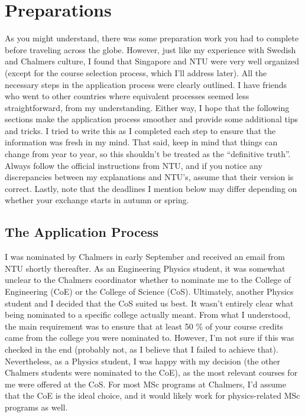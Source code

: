 \chapter*{Preparations}
\vspace{-0.6cm}
As you might understand, there was some preparation work you had to complete before traveling across the globe. However, just like my experience with Swedish and Chalmers culture, I found that Singapore and NTU were very well organized (except for the course selection process, which I'll address later). All the necessary steps in the application process were clearly outlined. I have friends who went to other countries where equivalent processes seemed less straightforward, from my understanding. Either way, I hope that the following sections make the application process smoother and provide some additional tips and tricks. I tried to write this as I completed each step to ensure that the information was fresh in my mind. That said, keep in mind that things can change from year to year, so this shouldn't be treated as the ``definitive truth''. Always follow the official instructions from NTU, and if you notice any discrepancies between my explanations and NTU's, assume that their version is correct. Lastly, note that the deadlines I mention below may differ depending on whether your exchange starts in autumn or spring.
\vspace{-0.25cm}
\section*{The Application Process}
\label{app}
I was nominated by Chalmers in early September and received an email from NTU shortly thereafter. As an Engineering Physics student, it was somewhat unclear to the Chalmers coordinator whether to nominate me to the College of Engineering (CoE) or the College of Science (CoS). Ultimately, another Physics student and I decided that the CoS suited us best. It wasn't entirely clear what being nominated to a specific college actually meant. From what I understood, the main requirement was to ensure that at least 50 \% of your course credits came from the college you were nominated to. However, I'm not sure if this was checked in the end (probably not, as I believe that I failed to achieve that). Nevertheless, as a Physics student, I was happy with my decision (the other Chalmers students were nominated to the CoE), as the most relevant courses for me were offered at the CoS. For most MSc programs at Chalmers, I'd assume that the CoE is the ideal choice, and it would likely work for physics-related MSc programs as well. 

